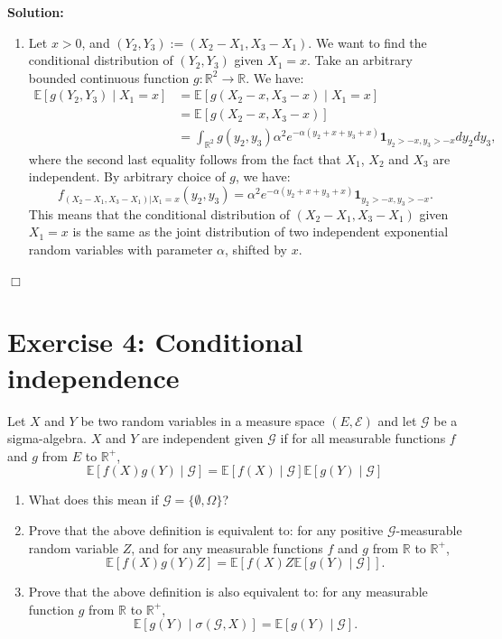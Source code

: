 \documentclass[12pt]{article}
\newenvironment{solution}{\vspace{0.2cm}\color{blue}\textbf{Solution:}}{\hfill\ensuremath{\Box}}
\begin{document}
\begin{solution}
\begin{enumerate}[label=\arabic*.]
    \item Let $x>0$, and $(Y_2, Y_3) := (X_2-X_1, X_3-X_1)$. We want to find the conditional distribution of $(Y_2, Y_3)$ given $X_1=x$.
    Take an arbitrary bounded continuous function $g : \mathbb{R}^2 \to \mathbb{R}$. We have:
    \begin{align*}
        \mathbb{E}[g(Y_2, Y_3) \mid X_1 = x] 
        &= \mathbb{E}[g(X_2 - x, X_3 - x) \mid X_1 = x] \\
        &= \mathbb{E}[g(X_2 - x, X_3 - x)] \\
        &= \int_{\mathbb{R}^2} g(y_2,y_3)\alpha^2 e^{-\alpha(y_2+x+y_3+x)}\mathbf{1}_{y_2>-x,y_3>-x} dy_2 dy_3,
    \end{align*}
    where the second last equality follows from the fact that $X_1$, $X_2$ and $X_3$ are independent.
    By arbitrary choice of $g$, we have:\[f_{(X_2-X_1,X_3-X_1)|X_1=x}(y_2,y_3) = \alpha^2 e^{-\alpha(y_2+x+y_3+x)}\mathbf{1}_{y_2>-x,y_3>-x}.\]
    This means that the conditional distribution of $ (X_2-X_1, X_3-X_1)$ given $X_1 = x$ is the same as the joint distribution of two independent exponential random variables with parameter $\alpha$, shifted by $x$.
\end{enumerate}
\end{solution}

\section*{Exercise 4: Conditional independence}
Let $X$ and $Y$ be two random variables in a measure space $(E, \mathcal{E})$ and let $\mathcal{G}$ be a sigma-algebra. $X$ and $Y$ are
independent given $\mathcal{G}$ if for all measurable functions $f$ and $g$ from $E$ to $\mathbb{R}^+$,
\[\mathbb{E}[f(X)g(Y) \mid \mathcal{G}] = \mathbb{E}[f(X) \mid \mathcal{G}]\mathbb{E}[g(Y) \mid \mathcal{G}]\]

\begin{enumerate}
    \item What does this mean if $\mathcal{G} = \{\emptyset, \Omega\}$?
    \item Prove that the above definition is equivalent to: for any positive $\mathcal{G}$-measurable random variable $Z$, and
for any measurable functions $f$ and $g$ from $\mathbb{R}$ to $\mathbb{R}^+$,
\[\mathbb{E}[f(X)g(Y)Z] = \mathbb{E}[f(X)Z\mathbb{E}[g(Y) \mid \mathcal{G}]].\]
    \item Prove that the above definition is also equivalent to: for any measurable function $g$ from $\mathbb{R}$ to $\mathbb{R}^+$,
\[\mathbb{E}[g(Y) \mid \sigma(\mathcal{G},X)] = \mathbb{E}[g(Y) \mid \mathcal{G}].\]
\end{enumerate}
\end{document}
